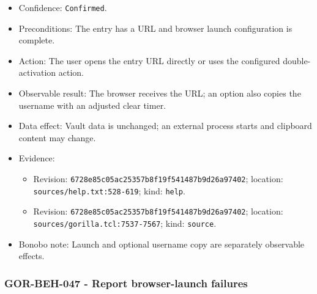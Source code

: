 \documentclass[
  letterpaper,
]{article}
\newcommand{\passthrough}[1]{#1}
\providecommand{\tightlist}{%
  \setlength{\itemsep}{0pt}\setlength{\parskip}{0pt}}
\begin{document}
\begin{itemize}
\tightlist
\item
  Confidence: \passthrough{\lstinline!Confirmed!}.
\item
  Preconditions: The entry has a URL and browser launch configuration is complete.
\item
  Action: The user opens the entry URL directly or uses the configured double-activation action.
\item
  Observable result: The browser receives the URL; an option also copies the username with an adjusted clear timer.
\item
  Data effect: Vault data is unchanged; an external process starts and clipboard content may change.
\item
  Evidence:

  \begin{itemize}
  \tightlist
  \item
    Revision: \nolinkurl{6728e85c05ac25357b8f19f541487b9d26a97402}; location: \nolinkurl{sources/help.txt:528-619};
    kind: \passthrough{\lstinline!help!}.
  \item
    Revision: \nolinkurl{6728e85c05ac25357b8f19f541487b9d26a97402}; location: \nolinkurl{sources/gorilla.tcl:7537-7567};
    kind: \passthrough{\lstinline!source!}.
  \end{itemize}
\item
  Bonobo note: Launch and optional username copy are separately observable effects.
\end{itemize}

\subsubsection{GOR-BEH-047 - Report browser-launch failures}\label{gor-beh-047---report-browser-launch-failures}
\end{document}
